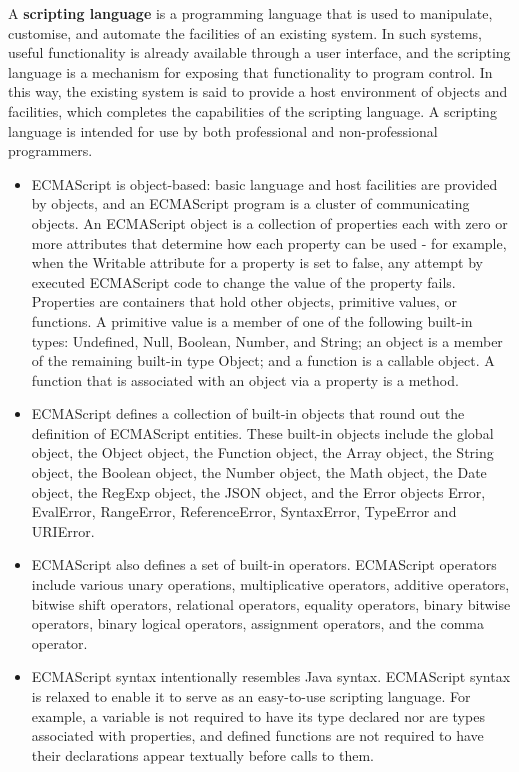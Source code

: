 \documentclass[thesis=B,english]{FITthesis}[2012/10/20]
\begin{document}
A \textbf{scripting language} is a programming language that is used to manipulate, customise, and automate the facilities of an existing system. In such systems, useful functionality is already available through a user interface, and the scripting language is a mechanism for exposing that functionality to program control. In this way, the existing system is said to provide a host environment of objects and facilities, which completes the capabilities of the scripting language. A scripting language is intended for use by both professional and non-professional programmers.

	\begin{itemize}
\item ECMAScript is object-based: basic language and host facilities are provided by objects, and an ECMAScript program is a cluster of communicating objects. An ECMAScript object is a collection of properties each with zero or more attributes that determine how each property can be used - for example, when the Writable attribute for a property is set to false, any attempt by executed ECMAScript code to change the value of the property fails. Properties are containers that hold other objects, primitive values, or functions. A primitive value is a member of one of the following built-in types: Undefined, Null, Boolean, Number, and String; an object is a member of the remaining built-in type Object; and a function is a callable object. A function that is associated with an object via a property is a method.
\item ECMAScript defines a collection of built-in objects that round out the definition of ECMAScript entities. These built-in objects include the global object, the Object object, the Function object, the Array object, the String object, the Boolean object, the Number object, the Math object, the Date object, the RegExp object, the JSON object, and the Error objects Error, EvalError, RangeError, ReferenceError, SyntaxError, TypeError and URIError.
\item ECMAScript also defines a set of built-in operators. ECMAScript operators include various unary operations, multiplicative operators, additive operators, bitwise shift operators, relational operators, equality operators, binary bitwise operators, binary logical operators, assignment operators, and the comma operator.
\item ECMAScript syntax intentionally resembles Java syntax. ECMAScript syntax is relaxed to enable it to serve as an easy-to-use scripting language. For example, a variable is not required to have its type declared nor are types associated with properties, and defined functions are not required to have their declarations appear textually before calls to them.\cite{ecma}
	\end{itemize}
\end{document}
